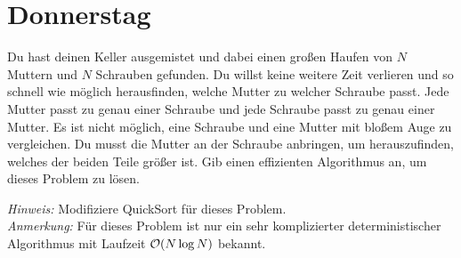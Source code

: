 \documentclass{uebung_cs}
\begin{document}
\section*{Donnerstag}

\begin{aufgabe}
	Du hast deinen Keller ausgemistet und dabei einen großen Haufen von $N$ Muttern und $N$ Schrauben gefunden. Du willst keine weitere Zeit verlieren und so schnell wie möglich herausfinden, welche Mutter zu welcher Schraube passt. Jede Mutter passt zu genau einer Schraube und jede Schraube passt zu genau einer Mutter. Es ist nicht möglich, eine Schraube und eine Mutter mit bloßem Auge zu vergleichen. Du musst die Mutter an der Schraube anbringen, um herauszufinden, welches der beiden Teile größer ist. Gib einen effizienten Algorithmus an, um dieses Problem zu lösen.
	
	\textit{Hinweis:} Modifiziere QuickSort für dieses Problem.\\
	\textit{Anmerkung:} Für dieses Problem ist nur ein sehr komplizierter deterministischer Algorithmus mit Laufzeit $\mathcal{O}(N \log N)$ bekannt. 
\end{aufgabe}
\end{document}
